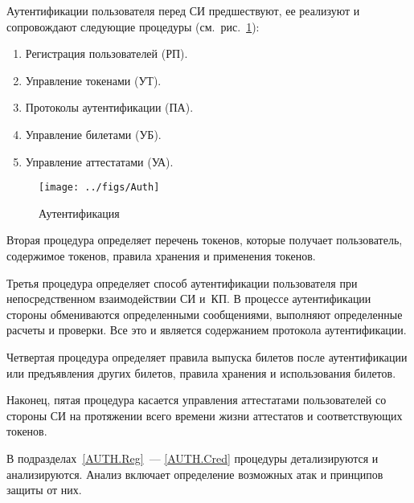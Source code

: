 
Аутентификации пользователя перед СИ предшествуют, 
ее реализуют и сопровождают следующие процедуры (см.~рис.~\ref{Fig.AUTH.Auth}): 
\begin{enumerate}
\item
Регистрация пользователей (РП).

\item
Управление токенами (УТ).

\item
Протоколы аутентификации (ПА).

\item
Управление билетами (УБ).

\item
Управление аттестатами (УА).
\end{enumerate}

\begin{figure}[bht]
\begin{center}
\texttt{[image: ../figs/Auth]}
\end{center}
\caption{Аутентификация}
\label{Fig.AUTH.Auth}
\end{figure}

Вторая процедура определяет перечень токенов, которые получает пользователь,
содержимое токенов, правила хранения и применения токенов.

Третья процедура определяет способ аутентификации пользователя 
при непосредственном взаимодействии СИ и~КП.
%
В процессе аутентификации стороны обмениваются 
определенными сообщениями, выполняют определенные расчеты и проверки.
%
Все это и является содержанием протокола аутентификации.

Четвертая процедура определяет правила выпуска билетов после 
аутентификации или предъявления других билетов, 
правила хранения и использования билетов. 

Наконец, пятая процедура касается управления аттестатами 
пользователей со стороны СИ на протяжении всего времени 
жизни аттестатов и соответствующих токенов.

В подразделах~\ref{AUTH.Reg}~--- \ref{AUTH.Cred} процедуры 
детализируются и анализируются. Анализ включает определение 
возможных атак и принципов защиты от них.
\fi